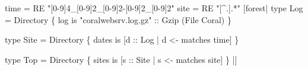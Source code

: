 \begin{code}
[pads|
  type Coral = ...
|]
\mbox{}
time = RE "[0-9]{4}_[0-9]{2}_[0-9]{2}-[0-9]{2}_[0-9]{2}"
site = RE "[^.].*"
\mbox{}
[forest|
  type Log = Directory 
    \{ log is "coralwebsrv.log.gz" 
          :: Gzip (File Coral) \}

  type Site = Directory
    \{ dates is [d :: Log | d <- matches time] \}

  type Top = Directory
    \{ sites is [s :: Site | s <- matches site] \}
|]
\end{code}